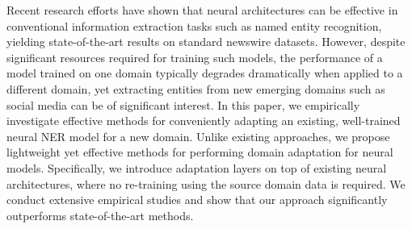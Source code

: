 Recent research efforts have shown that neural architectures can be effective in conventional information extraction tasks such as named entity recognition, yielding state-of-the-art results on standard newswire datasets. However, despite significant resources required for training such models, the performance of a  model trained on one domain typically degrades dramatically when applied to a different domain, yet extracting entities from new emerging domains such as social media can be of significant interest. In this paper, we empirically investigate effective methods for conveniently adapting an existing, well-trained neural NER model for a new domain. Unlike existing approaches, we propose lightweight yet effective methods for performing domain adaptation for neural models. Specifically, we introduce adaptation layers on top of existing neural architectures, where no re-training using the source domain data is required. We conduct extensive empirical studies and show that our approach significantly outperforms state-of-the-art methods.
